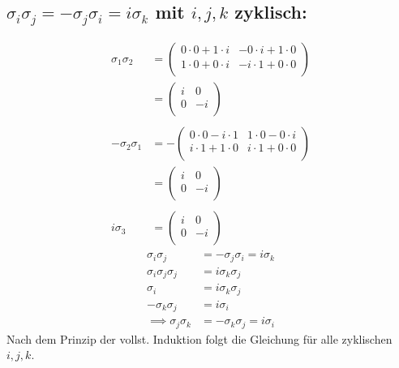 \documentclass[ex]{exercise}
\begin{document}
\subsection{\(\sigma_i\sigma_j = - \sigma_j \sigma_i = 
i \sigma_k\) mit \(i,j,k\) zyklisch:}
\begin{align*}
    \sigma_1\sigma_2 &= \begin{pmatrix}
        0\cdot0 + 1\cdot i&-0\cdot i + 1\cdot0\\
        1\cdot0 + 0\cdot i&-i\cdot1 + 0\cdot0\\
    \end{pmatrix}\\
    &= \begin{pmatrix}
        i&0\\
        0&-i\\
    \end{pmatrix}\\
    \\
    -\sigma_2\sigma_1 &= -\begin{pmatrix}
        0\cdot0 - i\cdot 1&1\cdot0 -0\cdot i\\
        i\cdot1 + 1\cdot0 &i\cdot1 + 0\cdot 0\\
    \end{pmatrix}\\
    &= \begin{pmatrix}
        i&0\\
        0&-i\\
    \end{pmatrix}\\
    \\
    i\sigma_3 &= \begin{pmatrix}
        i&0\\
        0&-i\\
    \end{pmatrix}
\end{align*}
\begin{align*}
    \sigma_i\sigma_j &= - \sigma_j \sigma_i = 
    i \sigma_k\\
    \sigma_i\sigma_j\sigma_j &= i \sigma_k\sigma_j\\
    \sigma_i&= i \sigma_k\sigma_j\\
    - \sigma_k\sigma_j &= i \sigma_i\\
    \implies \sigma_j\sigma_k &= - \sigma_k\sigma_j = i \sigma_i
\end{align*}
Nach dem Prinzip der vollst. Induktion folgt die Gleichung für alle zyklischen \(i,j,k\).
\end{document}
